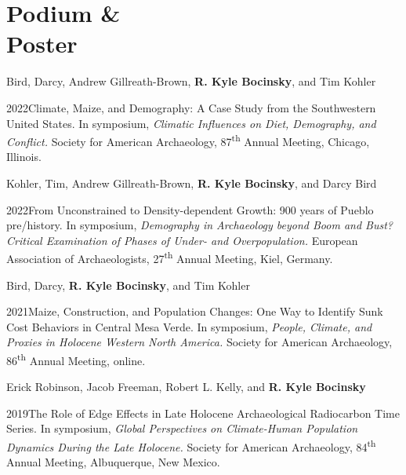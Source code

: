 \section{Podium \& \\Poster}


Bird, Darcy, Andrew Gillreath-Brown, {\bf R. Kyle Bocinsky}, and Tim Kohler 
\nopagebreak
\begin{list1}
\item[] 2022\hspace{.2cm}Climate, Maize, and Demography: A Case Study from the Southwestern United States. In symposium, \emph{Climatic Influences on Diet, Demography, and Conflict.} Society for American Archaeology, 87\textsuperscript{th} Annual Meeting, Chicago, Illinois.
\end{list1}

Kohler, Tim, Andrew Gillreath-Brown, {\bf R. Kyle Bocinsky}, and Darcy Bird 
\nopagebreak
\begin{list1}
\item[] 2022\hspace{.2cm}From Unconstrained to Density-dependent Growth: 900 years of Pueblo pre/history. In symposium, \emph{Demography in Archaeology beyond Boom and Bust? Critical Examination of Phases of Under- and Overpopulation.} European Association of Archaeologists, 27\textsuperscript{th} Annual Meeting, Kiel, Germany.
\end{list1}


Bird, Darcy, {\bf R. Kyle Bocinsky}, and Tim Kohler 
\nopagebreak
\begin{list1}
\item[] 2021\hspace{.2cm}Maize, Construction, and Population Changes: One Way to Identify Sunk Cost Behaviors in Central Mesa Verde. In symposium, \emph{People, Climate, and Proxies in Holocene Western North America.} Society for American Archaeology, 86\textsuperscript{th} Annual Meeting, online.
\end{list1}

Erick Robinson, Jacob Freeman, Robert L. Kelly, and {\bf R. Kyle Bocinsky}
\nopagebreak
\begin{list1}
\item[] 2019\hspace{.2cm}The Role of Edge Effects in Late Holocene Archaeological Radiocarbon Time Series. In symposium, \emph{Global Perspectives on Climate-Human Population Dynamics During the Late Holocene.} Society for American Archaeology, 84\textsuperscript{th} Annual Meeting, Albuquerque, New Mexico.
\end{list1}

